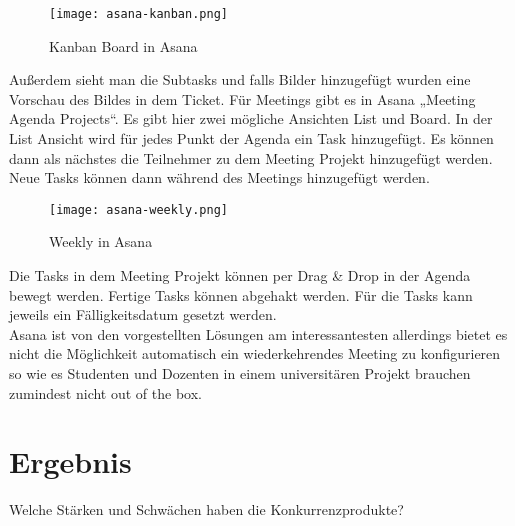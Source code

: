 \begin{figure}[H]
	\centering
	\texttt{[image: asana-kanban.png]}
    \caption{Kanban Board in Asana}
	\label{fig:kanbanasana}
\end{figure}


Außerdem sieht man die Subtasks und falls Bilder hinzugefügt wurden eine Vorschau des Bildes in dem Ticket. Für Meetings gibt es in Asana „Meeting Agenda Projects“. Es gibt hier zwei mögliche Ansichten List und Board. In der List Ansicht wird für jedes Punkt der Agenda ein Task hinzugefügt. Es können dann als nächstes die Teilnehmer zu dem Meeting Projekt hinzugefügt werden. Neue Tasks können dann während des Meetings hinzugefügt werden.

\begin{figure}[H]
	\centering
	\texttt{[image: asana-weekly.png]}
    \caption{Weekly in Asana}
	\label{fig:weeklyasana}
\end{figure}

Die Tasks in dem Meeting Projekt können per Drag \& Drop in der Agenda bewegt werden. Fertige Tasks können abgehakt werden. Für die Tasks kann jeweils ein Fälligkeitsdatum gesetzt werden.\\
Asana ist von den vorgestellten Lösungen am interessantesten allerdings bietet es nicht die Möglichkeit automatisch ein wiederkehrendes Meeting zu konfigurieren so wie es Studenten und Dozenten in einem universitären Projekt brauchen zumindest nicht out of the box.

\section{Ergebnis}

Welche Stärken und Schwächen haben die Konkurrenzprodukte?\\


